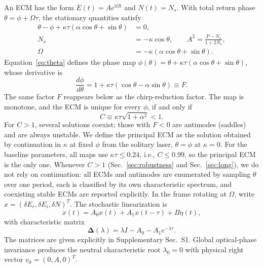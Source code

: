\documentclass{optica-article}
\newif\ifmarked
\newenvironment{revised}{\ifmarked\color{blue}\fi}{}
\newcommand{\ii}{\mathrm{i}}
\newcommand{\Dmat}{\bm{\Delta}}
\begin{document}
An ECM has the form $E(t)=A e^{\ii\Omega t}$ and $N(t)=N_s$. With total return phase $\theta=\phi+\Omega\tau$, the stationary quantities satisfy
\begin{align}
 \theta-\phi+\kappa\tau(\alpha\cos\theta+\sin\theta)&=0, \label{eq:theta}\\
 N_s&=-\kappa\cos\theta,\qquad
 A^2=\frac{P-N_s}{1+2N_s}, \label{eq:ecm}\\
 \Omega&=-\kappa(\alpha\cos\theta+\sin\theta). \label{eq:omega}
\end{align}
\begin{revised}Equation~\eqref{eq:theta} defines the phase map $\phi(\theta)=\theta+\kappa\tau(\alpha\cos\theta+\sin\theta)$, whose derivative is
\begin{equation}
 \frac{d\phi}{d\theta}=1+\kappa\tau(\cos\theta-\alpha\sin\theta)\equiv F.
 \label{eq:dphidtheta}
\end{equation}
The same factor $F$ reappears below as the chirp-reduction factor. The map is monotone, and the ECM is unique for every $\phi$, if and only if
\begin{equation}
 C\equiv\kappa\tau\sqrt{1+\alpha^2}<1.
 \label{eq:Cparam}
\end{equation}
For $C>1$, several solutions coexist; those with $F<0$ are antimodes (saddles) and are always unstable. We define the principal ECM as the solution obtained by continuation in $\kappa$ at fixed $\phi$ from the solitary laser, $\theta=\phi$ at $\kappa=0$. For the baseline parameters, all maps use $\kappa\tau\le0.24$, i.e., $C\le0.99$, so the principal ECM is the only one. Whenever $C>1$ (Sec.~\ref{sec:robustness} and Sec.~\ref{sec:long}), we do not rely on continuation: all ECMs and antimodes are enumerated by sampling $\theta$ over one period, each is classified by its own characteristic spectrum, and coexisting stable ECMs are reported explicitly.\end{revised} In the frame rotating at $\Omega$, write $x=(\delta E_r,\delta E_i,\delta N)^T$. The stochastic linearization is
\begin{equation}
 \dot x(t)=A_0x(t)+A_1x(t-\tau)+B\eta(t),
 \label{eq:linearDDE}
\end{equation}
with characteristic matrix
\begin{equation}
 \Dmat(\lambda)=\lambda I-A_0-A_1e^{-\lambda\tau}.
 \label{eq:characteristic}
\end{equation}
The matrices are given explicitly in Supplementary Sec.~S1. Global optical-phase invariance produces the neutral characteristic root $\lambda_0=0$ with physical right vector $v_0=(0,A,0)^T$.
\end{document}
